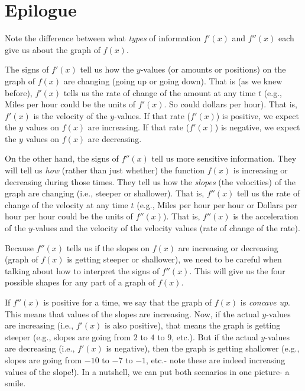 \documentclass{ximera}
\begin{document}
\section*{Epilogue}

Note the difference between what {\em types} of information $f'(x)$ and $f''(x)$ each give us about the graph of $f(x)$.  

The signs of $f'(x)$ tell us how the $y$-values (or amounts or positions) on the graph of $f(x)$ are changing (going up or going down).  That is (as we knew before), $f'(x)$ tells us the rate of change of the amount at any time $t$ (e.g., Miles per hour could be the units of $f'(x)$.  So could dollars per hour).  That is, $f'(x)$ is the velocity of the $y$-values.  If that rate ($f'(x)$) is positive, we expect the $y$ values on $f(x)$ are increasing.  If that rate ($f'(x)$) is negative, we expect the $y$ values on $f(x)$ are decreasing.

On the other hand, the signs of $f''(x)$ tell us more sensitive information.  They will tell us {\em how} (rather than just whether) the function $f(x)$ is increasing or decreasing during those times.  They tell us how the {\em slopes} (the velocities) of the graph are changing (i.e., steeper or shallower).  That is, $f''(x)$ tell us the rate of change of the velocity at any time $t$ (e.g., Miles per hour per hour or Dollars per hour per hour could be the units of $f''(x)$).  That is, $f''(x)$ is the acceleration of the $y$-values and the velocity of the velocity values (rate of change of the rate).

Because $f''(x)$ tells us if the slopes on $f(x)$ are increasing or decreasing (graph of $f(x)$ is getting steeper or shallower), we need to be careful when talking about how to interpret the signs of $f''(x)$.  This will give us the four possible shapes for any part of a graph of $f(x)$.

If $f''(x)$ is positive for a time, we say that the graph of $f(x)$ is {\em concave up}.  This means that values of the slopes are increasing.  Now, if the actual $y$-values are increasing (i.e., $f'(x)$ is also positive), that means the graph is getting steeper (e.g., slopes are going from $2$ to $4$ to $9$, etc.).  But if the actual $y$-values are decreasing (i.e., $f'(x)$ is negative), then the graph is getting shallower (e.g., slopes are going from $-10$ to $-7$ to $-1$, etc.- note these are indeed increasing values of the slope!). In a nutshell, we can put both scenarios in one picture- a smile.


\begin{center}
\end{center}
\end{document}
